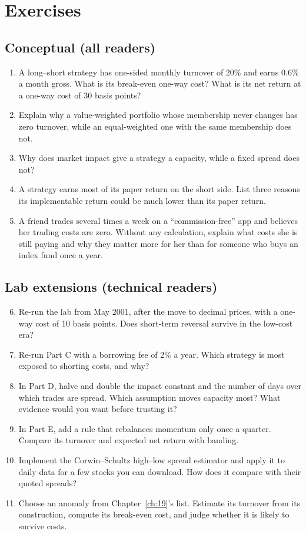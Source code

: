 \section*{Exercises}

\subsection*{Conceptual (all readers)}

\begin{enumerate}
  \item A long--short strategy has one-sided monthly turnover of 20\% and earns 0.6\% a month gross. What is its break-even one-way cost? What is its net return at a one-way cost of 30 basis points?
  \item Explain why a value-weighted portfolio whose membership never changes has zero turnover, while an equal-weighted one with the same membership does not.
  \item Why does market impact give a strategy a capacity, while a fixed spread does not?
  \item A strategy earns most of its paper return on the short side. List three reasons its implementable return could be much lower than its paper return.
  \item A friend trades several times a week on a ``commission-free'' app and believes her trading costs are zero. Without any calculation, explain what costs she is still paying and why they matter more for her than for someone who buys an index fund once a year.
\end{enumerate}

\subsection*{Lab extensions (technical readers)}

\begin{enumerate}
  \setcounter{enumi}{5}
  \item Re-run the lab from May 2001, after the move to decimal prices, with a one-way cost of 10 basis points. Does short-term reversal survive in the low-cost era?
  \item Re-run Part C with a borrowing fee of 2\% a year. Which strategy is most exposed to shorting costs, and why?
  \item In Part D, halve and double the impact constant and the number of days over which trades are spread. Which assumption moves capacity most? What evidence would you want before trusting it?
  \item In Part E, add a rule that rebalances momentum only once a quarter. Compare its turnover and expected net return with banding.
  \item Implement the Corwin--Schultz high--low spread estimator and apply it to daily data for a few stocks you can download. How does it compare with their quoted spreads?
  \item Choose an anomaly from Chapter~\ref{ch:19}'s list. Estimate its turnover from its construction, compute its break-even cost, and judge whether it is likely to survive costs.
\end{enumerate}
